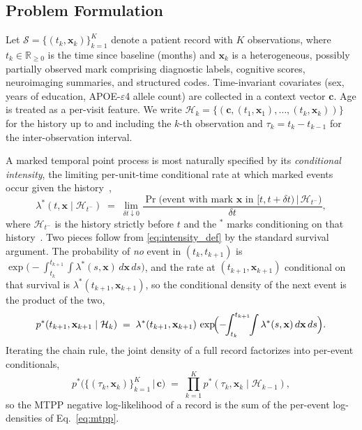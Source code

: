 \documentclass{article}
\newcommand{\Hcal}{\mathcal{H}}
\begin{document}
\subsection{Problem Formulation}
\label{sec:problem}

Let $\mathcal{S} = \{(t_k, \mathbf{x}_k)\}_{k=1}^{K}$ denote a patient record with $K$ observations, where $t_k \in \mathbb{R}_{\geq 0}$ is the time since baseline (months) and $\mathbf{x}_k$ is a heterogeneous, possibly partially observed mark comprising diagnostic labels, cognitive scores, neuroimaging summaries, and structured codes.
Time-invariant covariates (sex, years of education, APOE-$\varepsilon$4 allele count) are collected in a context vector $\mathbf{c}$. Age is treated as a per-visit feature.
We write $\Hcal_k = \{(\mathbf{c}, (t_1, \mathbf{x}_1), \ldots, (t_k, \mathbf{x}_k))\}$ for the history up to and including the $k$-th observation and $\tau_k = t_k - t_{k-1}$ for the inter-observation interval.

A marked temporal point process is most naturally specified by its \emph{conditional intensity}, the limiting per-unit-time conditional rate at which marked events occur given the history~\citep{daley2003introduction,kong2025language},
\begin{equation}
    \lambda^*(t, \mathbf{x} \mid \Hcal_{t^-})
    \;=\; \lim_{\delta t \downarrow 0}
    \frac{\Pr\!\bigl(\text{event with mark } \mathbf{x}
                     \text{ in } [t, t+\delta t)
                     \,\big|\, \Hcal_{t^-}\bigr)}{\delta t},
    \label{eq:intensity_def}
\end{equation}
where $\Hcal_{t^-}$ is the history strictly before $t$ and the $^*$ marks conditioning on that history~\citep{shchur2021neural}.
Two pieces follow from \eqref{eq:intensity_def} by the standard survival argument. The probability of \emph{no} event in $(t_k, t_{k+1})$ is
$\exp\!\bigl(-\!\!\int_{t_k}^{t_{k+1}}\!\!\int\lambda^*(s, \mathbf{x})\,d\mathbf{x}\,ds\bigr)$,
and the rate at $(t_{k+1}, \mathbf{x}_{k+1})$ conditional on that survival is $\lambda^*(t_{k+1}, \mathbf{x}_{k+1})$, so the conditional density of the next event is the product of the two,
\begin{equation}
    p^*(t_{k+1}, \mathbf{x}_{k+1} \mid \Hcal_k)
    \;=\; \lambda^*(t_{k+1}, \mathbf{x}_{k+1}) \,
          \exp\!\Bigl(-\!\!\int_{t_k}^{t_{k+1}}\!\!\int \lambda^*(s, \mathbf{x})\,d\mathbf{x}\,ds\Bigr).
    \label{eq:mtpp}
\end{equation}
Iterating the chain rule, the joint density of a full record factorizes into per-event conditionals,
\begin{equation}
    p^*\!\bigl(\{(\tau_k, \mathbf{x}_k)\}_{k=1}^{K} \,\big|\, \mathbf{c}\bigr)
    \;=\; \prod_{k=1}^{K} p^*(\tau_k, \mathbf{x}_k \mid \Hcal_{k-1}),
    \label{eq:mtpp_joint}
\end{equation}
so the MTPP negative log-likelihood of a record is the sum of the per-event log-densities of Eq.~\eqref{eq:mtpp}.
\end{document}
